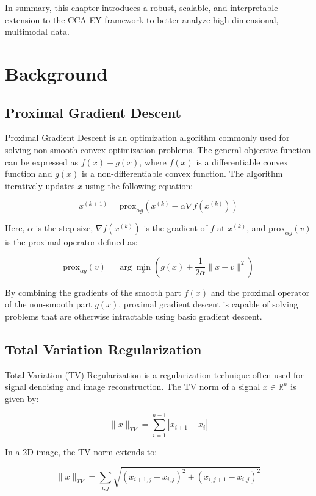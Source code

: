 In summary, this chapter introduces a robust, scalable, and interpretable extension to the CCA-EY framework to better analyze high-dimensional, multimodal data.

\section{Background}

\subsection{Proximal Gradient Descent}

Proximal Gradient Descent is an optimization algorithm commonly used for solving non-smooth convex optimization problems.
The general objective function can be expressed as \( f(x) + g(x) \), where \( f(x) \) is a differentiable convex function and \( g(x) \) is a non-differentiable convex function.
The algorithm iteratively updates \( x \) using the following equation:

\[
x^{(k+1)} = \text{prox}_{\alpha g} \left( x^{(k)} - \alpha \nabla f(x^{(k)}) \right)
\]

Here, \( \alpha \) is the step size, \( \nabla f(x^{(k)}) \) is the gradient of \( f \) at \( x^{(k)} \), and \( \text{prox}_{\alpha g}(v) \) is the proximal operator defined as:

\[
\text{prox}_{\alpha g}(v) = \arg\min_{x} \left( g(x) + \frac{1}{2\alpha} \| x - v \|^2 \right)
\]

By combining the gradients of the smooth part \( f(x) \) and the proximal operator of the non-smooth part \( g(x) \), proximal gradient descent is capable of solving problems that are otherwise intractable using basic gradient descent.

\subsection{Total Variation Regularization}

Total Variation (TV) Regularization is a regularization technique often used for signal denoising and image reconstruction. The TV norm of a signal \( x \in \mathbb{R}^n \) is given by:

\[
\| x \|_{TV} = \sum_{i=1}^{n-1} |x_{i+1} - x_i|
\]

In a 2D image, the TV norm extends to:

\[
\| x \|_{TV} = \sum_{i,j} \sqrt{(x_{i+1,j} - x_{i,j})^2 + (x_{i,j+1} - x_{i,j})^2}
\]

